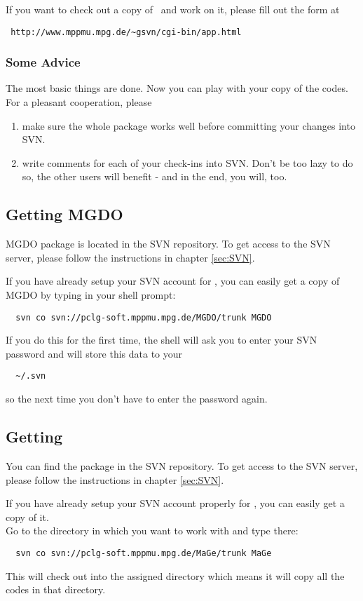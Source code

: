 \vspace{5mm}
If you want to check out a copy of \mage \ and work on it, please fill out the form at
\begin{lstlisting}
 http://www.mppmu.mpg.de/~gsvn/cgi-bin/app.html
\end{lstlisting}

\subsubsection{Some Advice}
The most basic things are done. Now you can play with your copy of the codes. For a pleasant cooperation, please 
\begin{enumerate}
 \item make sure the whole package works well before committing your changes into SVN.
 \item write comments for each of your check-ins into SVN. Don't be too lazy to do so, the other users will benefit - and in the end, you will, too.
\end{enumerate}

\subsection{Getting MGDO}
MGDO package is located in the SVN repository. To get access to the SVN server, please follow the instructions in chapter \ref{sec:SVN}.

If you have already setup your SVN account for \mage, you can easily get a copy of MGDO by typing in your shell prompt:
\begin{lstlisting}
  svn co svn://pclg-soft.mppmu.mpg.de/MGDO/trunk MGDO
\end{lstlisting}
If you do this for the first time, the shell will ask you to enter your SVN password and will store this data to your
\begin{lstlisting}
  ~/.svn
\end{lstlisting}
so the next time you don't have to enter the password again.


\subsection{Getting \mage}
You can find the \mage package in the SVN repository.
To get access to the SVN server, please follow the instructions in chapter \ref{sec:SVN}.

If you have already setup your SVN account properly for \mage, you can easily get a copy of it.\\
Go to the directory in which you want to work with \mage and type there:
\begin{lstlisting}
  svn co svn://pclg-soft.mppmu.mpg.de/MaGe/trunk MaGe
\end{lstlisting}
This will check out \mage into the assigned directory which means it will copy all the codes in that directory.\\

